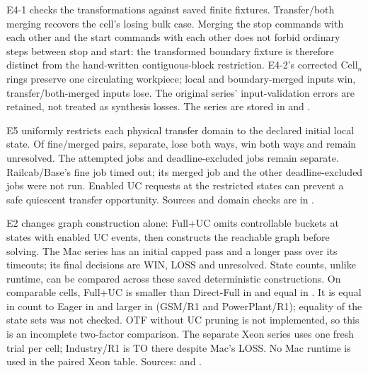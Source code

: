 \documentclass[11pt]{article}
\begin{document}
E4-1 checks the transformations against saved finite fixtures. Transfer/both merging recovers the cell's losing bulk case. Merging the stop commands with each other and the start commands with each other does not forbid ordinary steps between stop and start: the transformed boundary fixture is therefore distinct from the hand-written contiguous-block restriction. E4-2's corrected Cell$_n$ rings preserve one circulating workpiece; local and boundary-merged inputs win, transfer/both-merged inputs lose. The original series' input-validation errors are retained, not treated as synthesis losses. The series are stored in  and .

E5 uniformly restricts each physical transfer domain to the declared initial local state. Of \VThreeEFivePairs{} fine/merged pairs, \VThreeEFiveWitness{} separate, \VThreeEFiveBothLoss{} lose both ways, \VThreeEFiveBothWin{} win both ways and \VThreeEFiveIncomplete{} remain unresolved. The \VThreeEFiveTrials{} attempted jobs and \VThreeEFiveNotRun{} deadline-excluded jobs remain separate. Railcab/Base's fine job timed out; its merged job and the other deadline-excluded jobs were not run. Enabled UC requests at the restricted states can prevent a safe quiescent transfer opportunity. Sources and domain checks are in .

E2 changes graph construction alone: Full+UC omits controllable buckets at states with enabled UC events, then constructs the reachable graph before solving. The Mac series has an initial capped pass and a longer pass over its timeouts; its final decisions are \VThreeETwoMacWin{} WIN, \VThreeETwoMacLoss{} LOSS and \VThreeETwoMacTO{} unresolved. State counts, unlike runtime, can be compared across these saved deterministic constructions. On comparable cells, Full+UC is smaller than Direct-Full in \VThreeETwoStateSmaller{} and equal in \VThreeETwoStateEqual{}. It is equal in count to Eager in \VThreeETwoEagerStateEqual{} and larger in \VThreeETwoEagerStateMore{} (GSM/R1 and PowerPlant/R1); equality of the state sets was not checked. OTF without UC pruning is not implemented, so this is an incomplete two-factor comparison. The separate Xeon series uses one fresh trial per cell; Industry/R1 is TO there despite Mac's LOSS. No Mac runtime is used in the paired Xeon table. Sources:  and .
\end{document}
